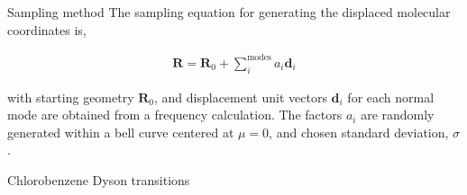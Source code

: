 \documentclass{beamer}
\begin{document}
\begin{frame}{Sampling method}
The sampling equation for generating the displaced molecular coordinates is,

\begin{eqnarray}
\textbf{R} = \textbf{R}_0 + \sum_i^{\textrm{modes}} a_i\textbf{d}_i
\end{eqnarray}

with starting geometry $\textbf{R}_0$, and displacement unit vectors $\textbf{d}_i$ for each normal mode are obtained from a frequency calculation.  The factors $a_i$ are randomly generated within a bell curve centered at $\mu=0$, and chosen standard deviation, $\sigma$. 
\end{frame}

\begin{frame}{Chlorobenzene Dyson transitions}

\end{frame}
\end{document}
